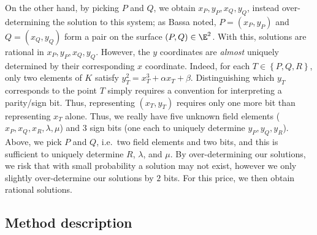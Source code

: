 \documentclass[11pt,letterpaper]{article}
\theoremstyle{definition}
\newcommand{\6}{\mathbf}
\newcommand{\7}{\mathcal}
\begin{document}
On the other hand, by picking $P$ and $Q$, we obtain $x_P, y_P, x_Q, y_Q$, instead over-determining the solution to this system; as Bassa noted, $P = (x_P, y_P)$ and $Q = (x_Q, y_Q)$ form a pair on the surface $(P, Q) \in \E^2$. With this, solutions are rational in $x_P, y_P, x_Q, y_Q$.
However, the $y$ coordinates are \textit{almost} uniquely determined by their corresponding $x$ coordinate. Indeed, for each $T \in \left\{P, Q, R\right\}$, only two elements of $K$ satisfy $y_T^2 = x_T^3 + \alpha x_T + \beta$. Distinguishing which $y_T$ corresponds to the point $T$ simply requires a convention for interpreting a parity/sign bit.
Thus, representing $(x_T,y_T)$ requires only one more bit than representing $x_T$ alone. Thus, we really have five unknown field elements ($x_P, x_Q, x_R, \lambda, \mu$) and $3$ sign bits (one each to uniquely determine $y_P, y_Q, y_R$). Above, we pick $P$ and $Q$, i.e.\ two field elements and two bits, and this is sufficient to uniquely determine $R$, $\lambda$, and $\mu$. 
By over-determining our solutions, we risk that with small probability a solution may not exist, however we only slightly over-determine our solutions by $2$ bits.
For this price, we then obtain rational solutions. 





\subsection{Method description}
\end{document}
